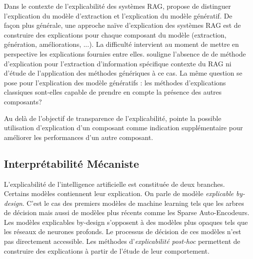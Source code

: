         Dans le contexte de l'explicabilité des systèmes RAG, \cite{ni_towards_2025} propose de distinguer l'explication du modèle d'extraction et l'explication du modèle génératif. De façon plus générale, une approche naïve d'explication des systèmes RAG est de construire des explications pour chaque composant du modèle (extraction, génération, améliorations, ...). La difficulté intervient au moment de mettre en perspective les explications fournies entre elles. \cite{ni_towards_2025} souligne l'absence de de méthode d'explication pour l'extraction d'information spécifique contexte du RAG ni d'étude de l'application des méthodes génériques à ce cas. La même question se pose pour l'explication des modèle génératifs : les méthodes d'explications classiques sont-elles capable de prendre en compte la présence des autres composants? 

        Au delà de l'objectif de transparence de l'explicabilité, \cite{ni_towards_2025} pointe la possible utilisation d'explication d'un composant comme indication supplémentaire pour améliorer les performances d'un autre composant. 

        


    \subsection{Interprétabilité Mécaniste}

        L'explicabilité de l'intelligence artificielle est constituée de deux branches. Certains modèles contiennent leur explication. On parle de modèle \textit{explicable by-design}. C'est le cas des premiers modèles de machine learning tels que les arbres de décision mais aussi de modèles plus récents comme les Sparse Auto-Encodeurs.\\
        Les modèles explicables by-design s'opposent à des modèles plus opaques tels que les réseaux de neurones profonds. Le processus de décision de ces modèles n'est pas directement accessible. Les méthodes d'\textit{explicabilité post-hoc} permettent de construire des explications à partir de l'étude de leur comportement.

